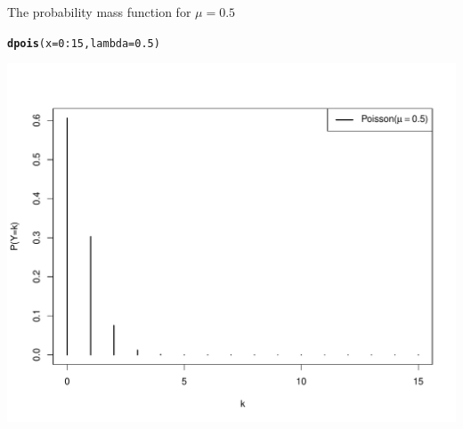 \documentclass[handout]{beamer}\usepackage[]{graphicx}\usepackage[]{color}
\newcommand{\hlnum}[1]{\textcolor[rgb]{0.686,0.059,0.569}{#1}}%
\newcommand{\hlopt}[1]{\textcolor[rgb]{0,0,0}{#1}}%
\newcommand{\hlstd}[1]{\textcolor[rgb]{0.345,0.345,0.345}{#1}}%
\newcommand{\hlkwc}[1]{\textcolor[rgb]{0.333,0.667,0.333}{#1}}%
\newcommand{\hlkwd}[1]{\textcolor[rgb]{0.737,0.353,0.396}{\textbf{#1}}}%
\newenvironment{knitrout}{}{} %
\begin{document}
\begin{frame}[fragile]{The probability mass function for $\mu=0.5$}

\begin{knitrout}\scriptsize
{}\color{fgcolor}
\begin{alltt}
\hlkwd{dpois}\hlstd{(}\hlkwc{x} \hlstd{=} \hlnum{0}\hlopt{:}\hlnum{15}\hlstd{,} \hlkwc{lambda} \hlstd{=} \hlnum{0.5}\hlstd{)}
\end{alltt}

\end{knitrout}

\vspace*{-0.5in}

\begin{knitrout}\scriptsize
{}\color{fgcolor}

{\centering \includegraphics[width=1\linewidth]{figure/unnamed-chunk-3-1} 

}



\end{knitrout}

\end{frame}
\end{document}
